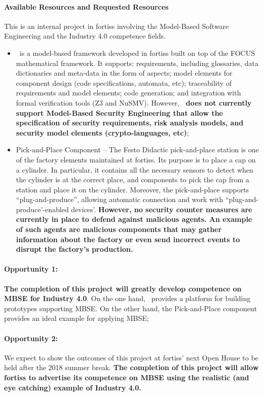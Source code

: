 \paragraph{Available Resources and Requested Resources} 
This is an internal project in fortiss involving the Model-Based Software Engineering and the Industry 4.0 competence fields. 
\begin{itemize}
  \item \autofocus\ is a model-based framework developed in fortiss built on top
  of the FOCUS mathematical framework. It supports: requirements, including
  glossaries, data dictionaries and meta-data in the form of aspects; model elements for component design (code specifications, automata, etc); traceability of requirements and model elements; code generation; and integration with formal verification tools (Z3 and NuSMV). However, \textbf{\autofocus\  does not currently support Model-Based Security Engineering that allow the specification of security requirements, risk analysis models, and security model elements (crypto-languages, etc)};


  \item Pick-and-Place Component -- The Festo Didactic pick-and-place station is
  one of the factory elements maintained at fortiss. Its purpose is to place a
  cap on a cylinder. In particular, it contains all the necessary sensors to
  detect when the cylinder is at the correct place, and components to pick the
  cap from a station and place it on the cylinder. Moreover, the pick-and-place
  supports ``plug-and-produce'', allowing automatic connection and work with
  ``plug-and-produce'-enabled devices'. \textbf{However, no security
  counter measures are currently in place to defend against malicious agents.
  An example of such agents are malicious components that may gather information
  about the factory or even send incorrect events to disrupt the factory's production.}
\end{itemize}

\paragraph{Opportunity 1:} \textbf{The completion of this project will greatly
develop competence on MBSE for Industry 4.0}. On the one hand, \autofocus\
provides a platform for building prototypes supporting MBSE. On the other hand, the Pick-and-Place component provides an ideal example for applying MBSE;

\paragraph{Opportunity 2:} We expect to show the outcomes of this project at
fortiss' next Open House to be held after the 2018 summer break. \textbf{The
completion of this project will allow fortiss to advertise its competence on MBSE using the realistic (and eye catching) example of Industry 4.0.}

